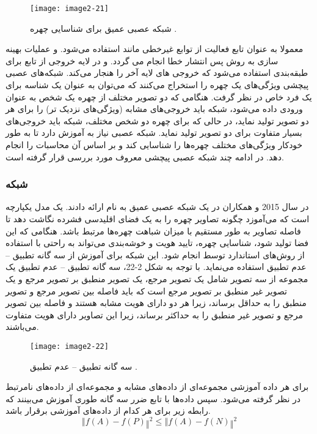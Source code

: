 \begin{figure}[h]
\centering
  \texttt{[image: image2-21]}
  \caption{شبکه عصبی عمیق برای شناسایی چهره \cite{ref1}.}
  \label{image2-21}
\end{figure}

\noindent
معمولا به عنوان تابع فعالیت از توابع غیرخطی مانند   استفاده می‌شود. و عملیات بهینه سازی به روش پس انتشار خطا انجام می گردد. و در لایه خروجی از تابع  برای طبقه‌بندی استفاده می‌شود که خروجی های لایه آخر را هنجار می‌کند. شبکه‌های عصبی پیچشی ویژگی‌های یک چهره را استخراج می‌کنند که می‌توان به عنوان یک شناسه برای یک فرد خاص در نظر گرفت. هنگامی که دو تصویر مختلف از چهره یک شخص به عنوان ورودی داده می‌شود، شبکه باید خروجی‌های مشابه (ویژگی‌های نزدیک تر) را برای هر دو تصویر تولید نماید، در حالی که برای چهره دو شخص مختلف، شبکه باید خروجی‌های بسیار متفاوت برای دو تصویر تولید نماید. شبکه عصبی نیاز به آموزش دارد تا به طور خودکار ویژگی‌های مختلف چهره‌ها را شناسایی کند و بر اساس آن محاسبات را انجام دهد. در ادامه چند شبکه عصبی پیچشی معروف مورد بررسی قرار گرفته است.

\subsubsection{	شبکه }
در سال 2015  و همکاران در \cite{7298682} یک شبکه عصبی عمیق به نام  ارائه دادند.  یک مدل یکپارچه است که می‌آموزد چگونه تصاویر چهره را به یک فضای اقلیدسی فشرده نگاشت دهد تا فاصله تصاویر به طور مستقیم با میزان شباهت چهره‌ها مرتبط باشد. هنگامی که این فضا تولید شود، شناسایی چهره، تایید هویت و خوشه‌بندی می‌تواند به راحتی با استفاده از روش‌های استاندارد توسط  انجام شود. این شبکه برای آموزش از سه گانه تطبیق – عدم تطبیق استفاده می‌نماید. با توجه به شکل 2-22، سه گانه تطبیق – عدم تطبیق یک مجموعه از سه تصویر شامل یک تصویر مرجع، یک تصویر منطبق بر تصویر مرجع و یک تصویر غیر منطبق بر تصویر مرجع است که باید فاصله بین تصویر مرجع و تصویر منطبق را به حداقل برساند، زیرا هر دو دارای هویت مشابه هستند و فاصله بین تصویر مرجع و تصویر غیر منطبق را به حداکثر برساند، زیرا این تصاویر دارای هویت متفاوت می‌باشند. 
 
 \begin{figure}[h]
\centering
  \texttt{[image: image2-22]}
  \caption{سه گانه تطبیق – عدم تطبیق \cite{ref1}.}
  \label{image2-22}
\end{figure}

\noindent 
برای هر داده آموزشی  مجموعه‌ای از داده‌های مشابه  و مجموعه‌ای از داده‌های نامرتبط  در نظر گرفته می‌شود. سپس داده‌ها با تابع ضرر سه گانه طوری آموزش می‌بینند که رابطه زیر برای هر کدام از داده‌های آموزشی برقرار باشد.
\begin{equation}\label{eq2-10}
‖f(A)-f(P)‖^2≤‖f(A)-f(N)‖^2	
\end{equation}

